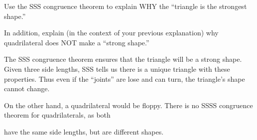 \documentclass{ximera}
\begin{document}
\begin{question}
  Use the SSS congruence theorem to explain WHY the ``triangle is the
  strongest shape.''

  

  In addition, explain (in the context of your previous explanation)
  why quadrilateral does NOT make a ``strong shape.''
  \begin{freeResponse}
    The SSS congruence theorem ensures that the triangle will be a
    strong shape. Given three side lengths, SSS tells us there is a
    unique triangle with these properties. Thus even if the ``joints''
    are lose and can turn, the triangle's shape cannot change.

    On the other hand, a quadrilateral would be floppy. There is no
    SSSS congruence theorem for quadrilaterals, as both

    \begin{center}
    \end{center}
    have the same side lengths, but are different shapes.
  \end{freeResponse}
\end{question}
\end{document}

